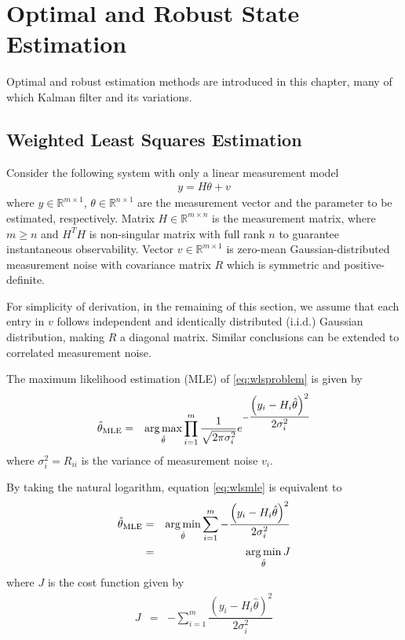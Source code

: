 \chapter{Optimal and Robust State Estimation} \label{ch:orse}

Optimal and robust estimation methods are introduced in this chapter, many of which Kalman filter and its variations.

\section{Weighted Least Squares Estimation}


Consider the following system with only a linear measurement model
\begin{eqnarray}
	y = H\theta + v \label{eq:wlsproblem}
\end{eqnarray}
where $y\in\mathbb{R}^{m\times 1}$, $\theta\in\mathbb{R}^{n\times 1}$ are the measurement vector and the parameter to be estimated, respectively. Matrix $H\in\mathbb{R}^{m\times n}$ is the measurement matrix, where $m\geq n$ and $H^TH$ is non-singular matrix with full rank $n$ to guarantee instantaneous observability. Vector $v\in\mathbb{R}^{m\times 1}$ is zero-mean Gaussian-distributed measurement noise with covariance matrix $R$ which is symmetric and positive-definite. 

For simplicity of derivation, in the remaining of this section, we assume that each entry in $v$ follows independent and identically distributed (i.i.d.) Gaussian distribution, making $R$ a diagonal matrix. Similar conclusions can be extended to correlated measurement noise.

The maximum likelihood estimation (MLE) of \eqref{eq:wlsproblem} is given by
\begin{eqnarray}
	\hat{\theta}_{\textup{MLE}} &=& \operatorname*{arg\,max}_{\hat{\theta}} \prod_{i=1}^{m} \dfrac{1}{\sqrt{2\pi\sigma_i^2}} e^{-\dfrac{\left(y_i-H_i\hat{\theta}\right)^2}{2\sigma_i^2}} \label{eq:wlsmle}
\end{eqnarray}
where $\sigma_i^2 = R_{ii}$ is the variance of measurement noise $v_i$.

By taking the natural logarithm, equation \eqref{eq:wlsmle} is equivalent to
\begin{eqnarray}
	\hat{\theta}_{\textup{MLE}} &=& \operatorname*{arg\,min}_{\hat{\theta}} \sum_{i=1}^{m} - \dfrac{\left(y_i-H_i\hat{\theta}\right)^2}{2\sigma_i^2} \nonumber \\
	&=& \operatorname*{arg\,min}_{\hat{\theta}} J \nonumber
\end{eqnarray}
where $J$ is the cost function given by
\begin{eqnarray}
	J &=& - \sum_{i=1}^{m} \dfrac{\left(y_i-H_i\hat{\theta}\right)^2}{2\sigma_i^2} \label{eq:wlsmle2}
\end{eqnarray}

